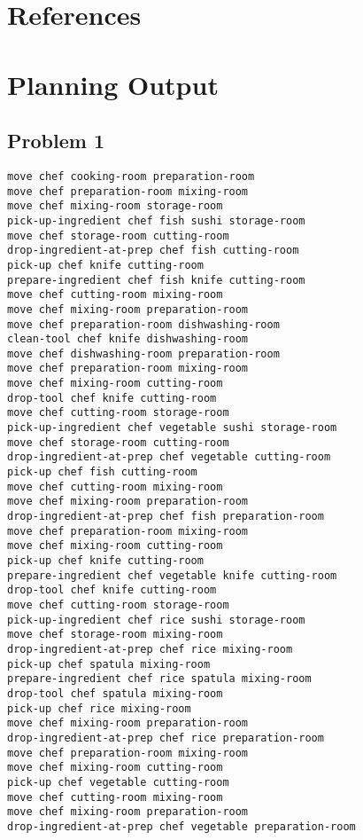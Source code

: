 \documentclass[a4paper,12pt]{article}
\begin{document}
\section{References}
\label{sec:references}



\appendix
\section{Planning Output}
\subsection{Problem 1}
\label{sec:plan1}
\begin{lstlisting}[language=PDDL, caption=Plan for Problem 1]
move chef cooking-room preparation-room 
move chef preparation-room mixing-room 
move chef mixing-room storage-room 
pick-up-ingredient chef fish sushi storage-room 
move chef storage-room cutting-room 
drop-ingredient-at-prep chef fish cutting-room 
pick-up chef knife cutting-room 
prepare-ingredient chef fish knife cutting-room 
move chef cutting-room mixing-room 
move chef mixing-room preparation-room 
move chef preparation-room dishwashing-room 
clean-tool chef knife dishwashing-room 
move chef dishwashing-room preparation-room 
move chef preparation-room mixing-room 
move chef mixing-room cutting-room 
drop-tool chef knife cutting-room 
move chef cutting-room storage-room 
pick-up-ingredient chef vegetable sushi storage-room 
move chef storage-room cutting-room 
drop-ingredient-at-prep chef vegetable cutting-room 
pick-up chef fish cutting-room 
move chef cutting-room mixing-room 
move chef mixing-room preparation-room 
drop-ingredient-at-prep chef fish preparation-room 
move chef preparation-room mixing-room 
move chef mixing-room cutting-room 
pick-up chef knife cutting-room 
prepare-ingredient chef vegetable knife cutting-room 
drop-tool chef knife cutting-room 
move chef cutting-room storage-room 
pick-up-ingredient chef rice sushi storage-room 
move chef storage-room mixing-room 
drop-ingredient-at-prep chef rice mixing-room 
pick-up chef spatula mixing-room 
prepare-ingredient chef rice spatula mixing-room 
drop-tool chef spatula mixing-room 
pick-up chef rice mixing-room 
move chef mixing-room preparation-room 
drop-ingredient-at-prep chef rice preparation-room 
move chef preparation-room mixing-room 
move chef mixing-room cutting-room 
pick-up chef vegetable cutting-room 
move chef cutting-room mixing-room 
move chef mixing-room preparation-room 
drop-ingredient-at-prep chef vegetable preparation-room 

\end{lstlisting}
\end{document}
